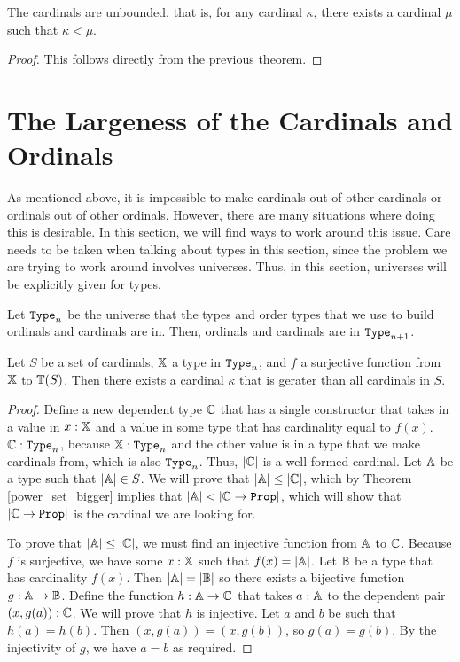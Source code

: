 \documentclass[../../math.tex]{subfiles}
\begin{document}
\begin{theorem} \label{card_unbounded}
    The cardinals are unbounded, that is, for any cardinal $\kappa$, there
    exists a cardinal $\mu$ such that $\kappa < \mu$.
\end{theorem}
\begin{proof}
    This follows directly from the previous theorem.
\end{proof}

\section{The Largeness of the Cardinals and Ordinals}

As mentioned above, it is impossible to make cardinals out of other cardinals or
ordinals out of other ordinals.  However, there are many situations where doing
this is desirable.  In this section, we will find ways to work around this
issue.  Care needs to be taken when talking about types in this section, since
the problem we are trying to work around involves universes.  Thus, in this
section, universes will be explicitly given for types.

Let $\Type_n$ be the universe that the types and order types that we use to
build ordinals and cardinals are in.  Then, ordinals and cardinals are in
$\Type_{n + 1}$.

\begin{theorem} \label{card_large_set}
    Let $S$ be a set of cardinals, $\mathbb{X}$ a type in $\Type_n$, and $f$ a
    surjective function from $\mathbb{X}$ to $\mathbb{T}(S)$.  Then there exists a cardinal
    $\kappa$ that is gerater than all cardinals in $S$.
\end{theorem}
\begin{proof}
    Define a new dependent type $\mathbb{C}$ that has a single constructor that takes in
    a value in $x : \mathbb{X}$ and a value in some type that has cardinality equal to
    $f(x)$.  $\C : \Type_n$, because $\X : \Type_n$ and the other value is in a
    type that we make cardinals from, which is also $\Type_n$.  Thus, $|\mathbb{C}|$ is
    a well-formed cardinal.  Let $\mathbb{A}$ be a type such that $|\mathbb{A}| \in S$.  We will
    prove that $|\mathbb{A}| \leq |\mathbb{C}|$, which by Theorem \ref{power_set_bigger} implies
    that $|\A| < |\C \to \Prop|$, which will show that $|\C \to \Prop|$ is the
    cardinal we are looking for.

    To prove that $|\mathbb{A}| \leq |\mathbb{C}|$, we must find an injective function from
    $\mathbb{A}$ to $\mathbb{C}$.  Because $f$ is surjective, we have some $x : \mathbb{X}$ such that
    $f(x) = |\mathbb{A}|$.  Let $\mathbb{B}$ be a type that has cardinality $f(x)$.  Then $|\mathbb{A}|
    = |\mathbb{B}|$ so there exists a bijective function $g : \mathbb{A} \to \mathbb{B}$.  Define the
    function $h : \mathbb{A} \to \mathbb{C}$ that takes $a : \mathbb{A}$ to the dependent pair $(x,
    g(a)) : \mathbb{C}$.  We will prove that $h$ is injective.  Let $a$ and $b$ be such
    that $h(a) = h(b)$.  Then $(x, g(a)) = (x, g(b))$, so $g(a) = g(b)$.  By the
    injectivity of $g$, we have $a = b$ as required.
\end{proof}
\end{document}
